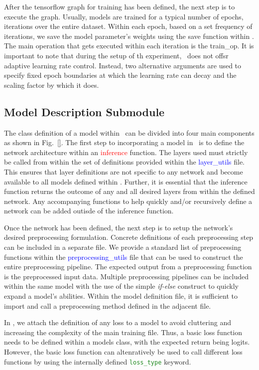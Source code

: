 \documentclass{llncs}
\begin{document}
After the tensorflow graph for training has been defined, the next step is to execute the graph. 
Usually, models are trained for a typical number of epochs, iterations over the entire dataset.
Within each epoch, based on a set frequency of iterations, we save the model parameter's weights using the save function within \checkpoint.
The main operation that gets executed within each iteration is the train\_op.
It is important to note that during the setup of th experiment, \acro~does not offsr adaptive learning rate control. Instead, two alternative arguments are used to specify fixed epoch boundaries at which the learning rate can decay and the scaling factor by which it does.

\subsection{Model Description Submodule}
\label{sec:modeldesc}

The class definition of a model within \acro~can be divided into four main components as shown in Fig.~\ref{}. 
The first step to incorporating a model in \acro~is to define the network architecture within an \textcolor{red}{inference} function.
The layers used must strictly be called from within the set of definitions provided within the \textcolor{blue}{layer\_utils} file.
This ensures that layer definitions are not specific to any network and become available to all models defined within \acro.
Further, it is essential that the inference function returns the outcome of any and all desired layers from within the defined network.
Any accompanying functions to help quickly and/or recursively define a network can be added outisde of the inference function.

Once the network has been defined, the next step is to setup the network's desired preprocessing formulation.
Concrete definitions of each preprocessing step can be included in a separate file.
We provide a standard list of preprocessing functions within the \textcolor{blue}{preprocessing\_utils} file that can be used to construct the entire preprocessing pipeline.
The expected output from a preprocessing function is the preprocessed input data.
Multiple preprocessing pipelines can be included within the same model with the use of the simple \textit{if-else} construct to quickly expand a model's abilities. 
Within the model definition file, it is sufficient to import and call a preprocessing method defined in the adjacent file.

In \acro, we attach the definition of any loss to a model to avoid cluttering and increasing the complexity of the main training file.
Thus, a basic loss function needs to be defined within a models class, with the expected return being logits.
However, the basic loss function can altenratively be used to call different loss functions by using the internally defined \texttt{\textcolor{ForestGreen}{loss\_type}} keyword.
\end{document}
